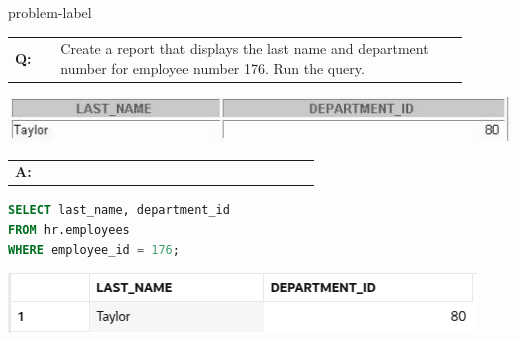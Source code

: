 \newpage
\begin{problem}{}{problem-label}

\begin{tabular}{@{}l p{0.9\linewidth}@{}}
  \textbf{Q:} & Create a report that displays the last name and department number for employee number 176. Run the query.
\end{tabular}

\begin{center}
  \includegraphics[scale=0.8]{images/c2q2.png}
\end{center}

\begin{tabular}{@{}l p{0.9\linewidth}@{}}
  \textbf{A:} &
\end{tabular}

\begin{lstlisting}[language=SQL]
SELECT last_name, department_id
FROM hr.employees
WHERE employee_id = 176;
\end{lstlisting}

\vspace{1em}

\begin{center}
  \includegraphics[scale=0.8]{images/c2a2.png}
\end{center}

\end{problem}

